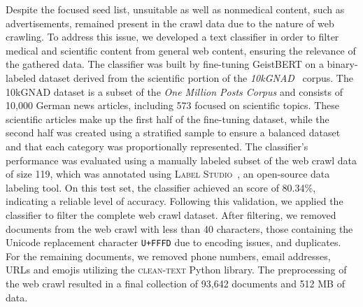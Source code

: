 Despite the focused seed list, unsuitable as well as nonmedical content, such as
advertisements, remained present in the crawl data due to the nature of web
crawling. To address this issue, we developed a text classifier in order to
filter medical and scientific content from general web content, ensuring the
relevance of the gathered data. The classifier was built by fine-tuning
GeistBERT on a binary-labeled dataset derived from the scientific portion of the
\textit{10kGNAD}~\cite{10kGNAD} corpus. The 10kGNAD dataset is a subset of the
\textit{One Million Posts Corpus} \cite{schabus2017one} and consists of 10,000
German news articles, including 573 focused on scientific topics. These
scientific articles make up the first half of the fine-tuning dataset, while the
second half was created using a stratified sample to ensure a balanced dataset
and that each category was proportionally represented. The classifier's
performance was evaluated using a manually labeled subset of the web crawl data
of size 119, which was annotated using \textsc{Label Studio}~\cite{labelstudio},
an open-source data labeling tool. On this test set, the classifier achieved an
\ff{} score of 80.34\%, indicating a reliable level of accuracy. Following this
validation, we applied the classifier to filter the complete web crawl dataset.
After filtering, we removed documents from the web crawl with less than 40
characters, those containing the Unicode replacement character \texttt{U+FFFD}
due to encoding issues, and duplicates. For the remaining documents, we removed
phone numbers, email addresses, URLs and emojis utilizing the
\textsc{clean-text} \cite{clean-text} Python library. The preprocessing of the
web crawl resulted in a final collection of 93,642 documents and 512 MB of data.
